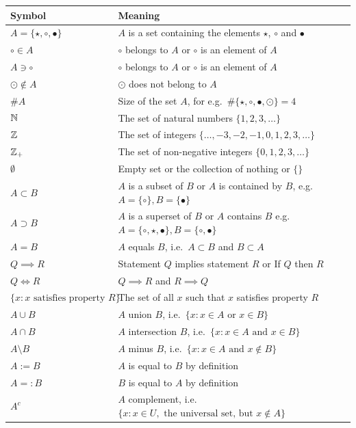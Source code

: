 \begin{table}[htb]
\centering
{\small
\begin{tabular}{| l | l |}
\hline
Symbol & Meaning\\ \hline
$A = \{ \star, \circ, \bullet \}$& $A$ is a set containing the elements $\star$, $\circ$ and $\bullet$ \\
$\circ \in A$ & $\circ$ belongs to $A$ or $\circ$ is an element of $A$\\
$A \ni \circ$ & $\circ$ belongs to $A$ or $\circ$ is an element of $A$\\
$\odot \notin A$& $\odot$ does not belong to $A$ \\
$\# A$& Size of the set $A$, for e.g.~$\#\{ \star, \circ, \bullet, \odot \}=4$\\
$\mathbb{N}$& The set of natural numbers $\{1,2,3,\ldots\}$\\
$\mathbb{Z}$&The set of integers $\{\ldots,-3,-2,-1,0,1,2,3,\ldots\}$\\
$\mathbb{Z}_+$& The set of non-negative integers $\{0,1,2,3,\ldots\}$\\
$\emptyset$&Empty set or the collection of nothing or $\{\}$\\
$A \subset B$ & $A$ is a subset of $B$ or $A$ is contained by $B$, e.g.~$A=\{\circ\}, B=\{\bullet\}$\\
$A \supset B$& $A$ is a superset of $B$ or $A$ contains $B$ e.g.~$A=\{\circ, \star,\bullet\}, B=\{\circ, \bullet\}$ \\
$A=B$ & $A$ equals $B$, i.e.~$A \subset B$ and  $B \subset A$\\
$Q \implies R$ & Statement $Q$ implies statement $R$ or If $Q$ then $R$ \\
$Q \iff R$ & $Q \implies R$ and $R \implies Q$ \\
$\{x: x \text{ satisfies property } R \}$& The set of all $x$ such that $x$ satisfies property $R$\\
$A \cup B$& $A$ union $B$, i.e.~$\{x: x\in A \text{ or } x \in B\}$\\
$A \cap B$& $A$ intersection $B$, i.e.~$\{x: x\in A \text{ and } x \in B\}$\\
$A \setminus B $& $A$ minus $B$, i.e.~$\{x: x\in A \text{ and } x \notin B\}$\\
$A:=B$& $A$ is equal to $B$ by definition\\
$A=:B$& $B$ is equal to $A$ by definition\\
$A^c$& $A$ complement, i.e.~$\{x: x\in U, \text{ the universal set, but } x \notin A\}$\\ 

\end{tabular}}
\end{table}

